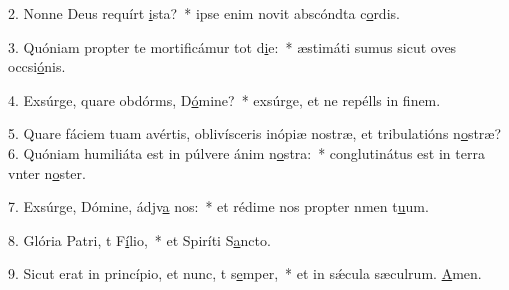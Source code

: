 2. Nonne Deus requírt \uline{i}sta?~* ipse enim novit abscóndta c\uline{o}rdis.\par 
3. Quóniam propter te mortificámur tot d\uline{i}e:~* æstimáti sumus sicut oves occsi\uline{ó}nis.\par 
4. Exsúrge, quare obdórms, D\uline{ó}mine?~* exsúrge, et ne repélls in f\uline{i}nem.\par 
5. Quare fáciem tuam avértis, oblivísceris inópiæ nostræ, et tribulatións n\uline{o}stræ?
6. Quóniam humiliáta est in púlvere ánim n\uline{o}stra:~* conglutinátus est in terra vnter n\uline{o}ster.\par 
7. Exsúrge, Dómine, ádjv\uline{a} nos:~* et rédime nos propter nmen t\uline{u}um.\par 
8. Glória Patri, t F\uline{í}lio,~* et Spiríti S\uline{a}ncto.\par 
9. Sicut erat in princípio, et nunc, t s\uline{e}mper,~* et in sǽcula sæculrum. \uline{A}men.\par 
